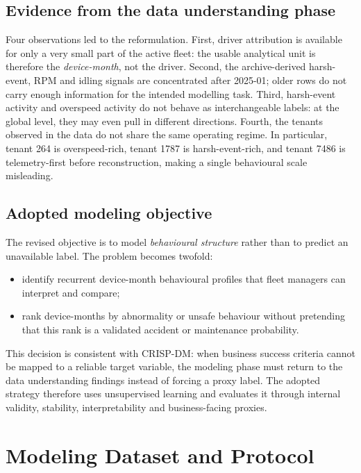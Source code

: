 \subsection{Evidence from the data understanding phase}
Four observations led to the reformulation. First, driver attribution is available for only a very small part of the active fleet: the usable analytical unit is therefore the \emph{device-month}, not the driver. Second, the archive-derived harsh-event, RPM and idling signals are concentrated after 2025-01; older rows do not carry enough information for the intended modelling task. Third, harsh-event activity and overspeed activity do not behave as interchangeable labels: at the global level, they may even pull in different directions. Fourth, the tenants observed in the data do not share the same operating regime. In particular, tenant 264 is overspeed-rich, tenant 1787 is harsh-event-rich, and tenant 7486 is telemetry-first before reconstruction, making a single behavioural scale misleading.

\subsection{Adopted modeling objective}
The revised objective is to model \emph{behavioural structure} rather than to predict an unavailable label. The problem becomes twofold:

\begin{itemize}
    \item identify recurrent device-month behavioural profiles that fleet managers can interpret and compare;
    \item rank device-months by abnormality or unsafe behaviour without pretending that this rank is a validated accident or maintenance probability.
\end{itemize}

This decision is consistent with CRISP-DM: when business success criteria cannot be mapped to a reliable target variable, the modeling phase must return to the data understanding findings instead of forcing a proxy label. The adopted strategy therefore uses unsupervised learning and evaluates it through internal validity, stability, interpretability and business-facing proxies.

\section{Modeling Dataset and Protocol}

